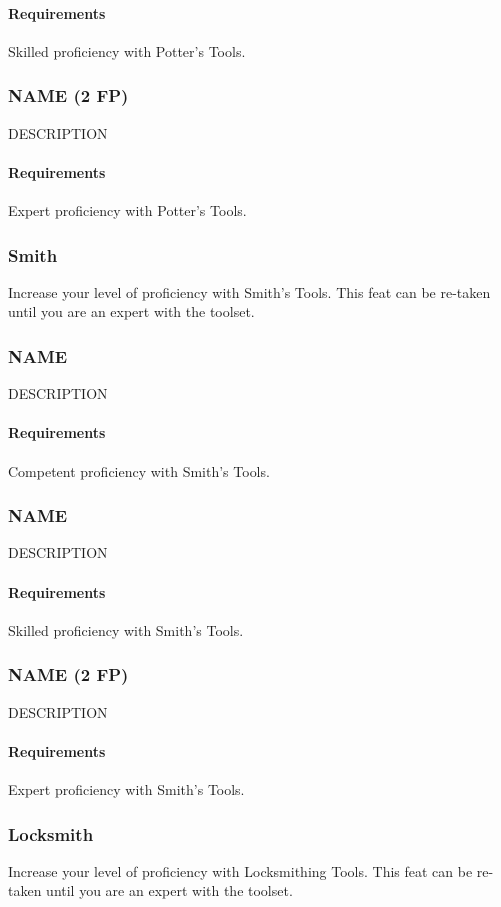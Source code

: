     \paragraph{Requirements} Skilled proficiency with Potter's Tools.
\subsubsection{NAME (2 FP)} \label{feat::name}
    DESCRIPTION
    \paragraph{Requirements} Expert proficiency with Potter's Tools.
\subsubsection{Smith} \label{feat::smith}
    Increase your level of proficiency with Smith's Tools.
    This feat can be re-taken until you are an expert with the toolset.
\subsubsection{NAME} \label{feat::name}
    DESCRIPTION
    \paragraph{Requirements} Competent proficiency with Smith's Tools.
\subsubsection{NAME} \label{feat::name}
    DESCRIPTION
    \paragraph{Requirements} Skilled proficiency with Smith's Tools.
\subsubsection{NAME (2 FP)} \label{feat::name}
    DESCRIPTION
    \paragraph{Requirements} Expert proficiency with Smith's Tools.
\subsubsection{Locksmith} \label{feat::locksmith}
    Increase your level of proficiency with Locksmithing Tools.
    This feat can be re-taken until you are an expert with the toolset.

